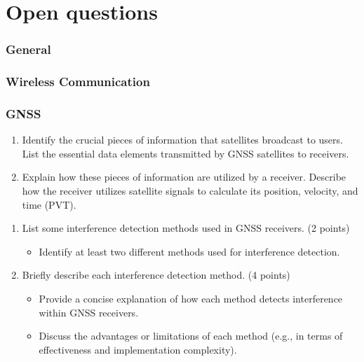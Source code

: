 \part{Open questions}
\begin{questions}
    


\section{ General}

\section{ Wireless Communication}



\section{GNSS}

\begin{enumerate}
    \item Identify the crucial pieces of information that satellites broadcast to users.
    List the essential data elements transmitted by GNSS satellites to receivers.
    \item Explain how these pieces of information are utilized by a receiver.
    Describe how the receiver utilizes satellite signals to calculate its position, velocity, and time (PVT).
\end{enumerate}



\begin{enumerate}
    \item List some interference detection methods used in GNSS receivers. (2 points)
    \begin{itemize}
        \item Identify at least two different methods used for interference detection.
    \end{itemize}
    \item Briefly describe each interference detection method. (4 points)
    \begin{itemize}
        \item Provide a concise explanation of how each method detects interference within GNSS receivers.
        \item Discuss the advantages or limitations of each method (e.g., in terms of effectiveness and implementation complexity).
    \end{itemize}
\end{enumerate}


\end{questions}
